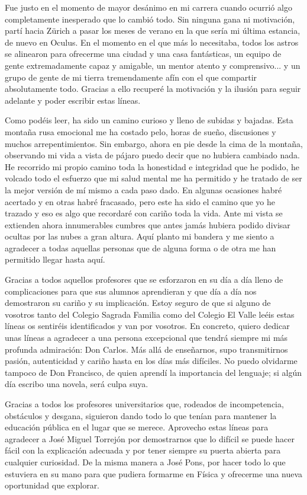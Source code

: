 Fue justo en el momento de mayor desánimo en mi carrera cuando ocurrió algo completamente inesperado que lo cambió todo. Sin ninguna gana ni motivación, partí hacia Zürich a pasar los meses de verano en la que sería mi última estancia, de nuevo en Oculus. En el momento en el que más lo necesitaba, todos los astros se alinearon para ofrecerme una ciudad y una casa fantásticas, un equipo de gente extremadamente capaz y amigable, un mentor atento y comprensivo... y un grupo de gente de mi tierra tremendamente afín con el que compartir absolutamente todo. Gracias a ello recuperé la motivación y la ilusión para seguir adelante y poder escribir estas líneas.

Como podéis leer, ha sido un camino curioso y lleno de subidas y bajadas. Esta montaña rusa emocional me ha costado pelo, horas de sueño, discusiones y muchos arrepentimientos. Sin embargo, ahora en pie desde la cima de la montaña, observando mi vida a vista de pájaro puedo decir que no hubiera cambiado nada. He recorrido mi propio camino toda la honestidad e integridad que he podido, he volcado todo el esfuerzo que mi salud mental me ha permitido y he tratado de ser la mejor versión de mí mismo a cada paso dado. En algunas ocasiones habré acertado y en otras habré fracasado, pero este ha sido el camino que yo he trazado y eso es algo que recordaré con cariño toda la vida.
Ante mi vista se extienden ahora innumerables cumbres que antes jamás hubiera podido divisar ocultas por las nubes a gran altura. Aquí planto mi bandera y me siento a agradecer a todas aquellas personas que de alguna forma o de otra me han permitido llegar hasta aquí.

Gracias a todos aquellos profesores que se esforzaron en su día a día lleno de complicaciones para que sus alumnos aprendieran y que día a día nos demostraron su cariño y su implicación. Estoy seguro de que si alguno de vosotros tanto del Colegio Sagrada Familia como del Colegio El Valle leéis estas líneas os sentiréis identificados y van por vosotros. En concreto, quiero dedicar unas líneas a agradecer a una persona excepcional que tendrá siempre mi más profunda admiración: Don Carlos. Más allá de enseñarnos, supo transmitirnos pasión, autenticidad y cariño hasta en los días más difíciles. No puedo olvidarme tampoco de Don Francisco, de quien aprendí la importancia del lenguaje; si algún día escribo una novela, será culpa suya.

Gracias a todos los profesores universitarios que, rodeados de incompetencia, obstáculos y desgana, siguieron dando todo lo que tenían para mantener la educación pública en el lugar que se merece. Aprovecho estas líneas para agradecer a José Miguel Torrejón por demostrarnos que lo difícil se puede hacer fácil con la explicación adecuada y por tener siempre su puerta abierta para cualquier curiosidad. De la misma manera a José Pons, por hacer todo lo que estuviera en su mano para que pudiera formarme en Física y ofrecerme una nueva oportunidad que explorar.

